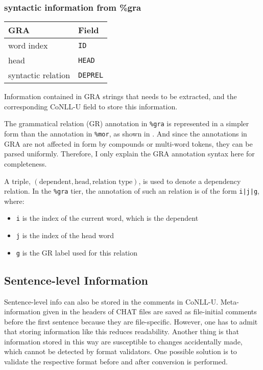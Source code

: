 \subsubsection{syntactic information from \%gra}

\begin{margintable}[1\baselineskip]
\begin{tabularx}{1\textwidth}{@{}ll@{}}
\toprule
\textbf{GRA} & \textbf{Field}\\\midrule
word index & \texttt{ID} \\
head & \texttt{HEAD}\\
syntactic relation & \texttt{DEPREL} \\\bottomrule
\end{tabularx}
\caption{\label{tab:martabgra}Information contained in GRA strings that needs to be extracted, and the corresponding CoNLL-U field to store this information.}
\footnotesize
\end{margintable}

The grammatical relation (GR) annotation in \texttt{\%gra} is represented in a simpler form than the annotation in \texttt{\%mor}, as shown in . And since the annotations in GRA are not affected in form by compounds or multi-word tokens, they can be parsed uniformly. Therefore, I only explain the GRA annotation syntax here for completeness.

A triple, $(\text{dependent}, \text{head}, \text{relation type})$, is used to denote a dependency relation. In the \texttt{\%gra} tier, the annotation of such an relation is of the form \texttt{i|j|g}, where:
\begin{itemize}
	\item \texttt{i} is the index of the current word, which is the dependent
	\item \texttt{j} is the index of the head word
	\item \texttt{g} is the GR label used for this relation
\end{itemize}


\subsection{Sentence-level Information}

Sentence-level info can also be stored in the comments in CoNLL-U. Meta-information given in the headers of CHAT files are saved as file-initial comments before the first sentence because they are file-specific.
However, one has to admit that storing information like this reduces readability. Another thing is that information stored in this way are susceptible to changes accidentally made, which cannot be detected by format validators. One possible solution is to validate the respective format before and after conversion is performed.


